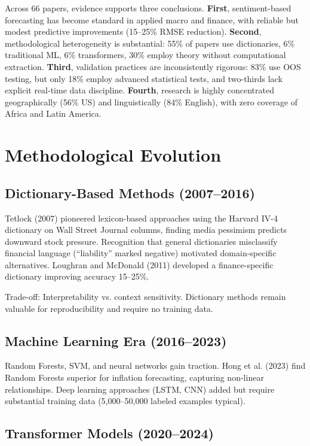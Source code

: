 \documentclass[11pt]{article}
\begin{document}
Across 66 papers, evidence supports three conclusions. \textbf{First}, sentiment-based forecasting has become standard in applied macro and finance, with reliable but modest predictive improvements (15--25\% RMSE reduction). \textbf{Second}, methodological heterogeneity is substantial: 55\% of papers use dictionaries, 6\% traditional ML, 6\% transformers, 30\% employ theory without computational extraction. \textbf{Third}, validation practices are inconsistently rigorous: 83\% use OOS testing, but only 18\% employ advanced statistical tests, and two-thirds lack explicit real-time data discipline. \textbf{Fourth}, research is highly concentrated geographically (56\% US) and linguistically (84\% English), with zero coverage of Africa and Latin America.

\newpage
\section{Methodological Evolution}

\subsection{Dictionary-Based Methods (2007--2016)}

Tetlock (2007) pioneered lexicon-based approaches using the Harvard IV-4 dictionary on Wall Street Journal columns, finding media pessimism predicts downward stock pressure. Recognition that general dictionaries misclassify financial language (``liability'' marked negative) motivated domain-specific alternatives. Loughran and McDonald (2011) developed a finance-specific dictionary improving accuracy 15--25\%.

Trade-off: Interpretability vs. context sensitivity. Dictionary methods remain valuable for reproducibility and require no training data.

\subsection{Machine Learning Era (2016--2023)}

Random Forests, SVM, and neural networks gain traction. Hong et al. (2023) find Random Forests superior for inflation forecasting, capturing non-linear relationships. Deep learning approaches (LSTM, CNN) added but require substantial training data (5,000--50,000 labeled examples typical).

\subsection{Transformer Models (2020--2024)}
\end{document}
